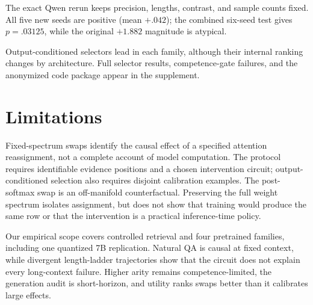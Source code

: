 \documentclass[letterpaper]{article} %
\begin{document}
The exact Qwen rerun keeps precision, lengths, contrast, and sample counts fixed. All five new seeds are positive
(mean $+.042$); the combined six-seed test gives $p=.03125$, while the original $+1.882$ magnitude is atypical.

Output-conditioned selectors lead in each family, although their internal ranking changes by architecture. Full
selector results, competence-gate failures, and the anonymized code package appear in the supplement.

\section{Limitations}

Fixed-spectrum swaps identify the causal effect of a specified attention reassignment, not a complete account
of model computation. The protocol requires identifiable evidence positions and a chosen intervention circuit;
output-conditioned selection also requires disjoint calibration examples. The post-softmax swap is an
off-manifold counterfactual. Preserving the full weight spectrum isolates assignment, but does not show that
training would produce the same row or that the intervention is a practical inference-time policy.

Our empirical scope covers controlled retrieval and four pretrained families, including one quantized 7B
replication. Natural QA is causal at fixed context, while divergent length-ladder trajectories show that the
circuit does not explain every long-context failure. Higher arity remains competence-limited, the generation
audit is short-horizon, and utility ranks swaps better than it calibrates large effects.

{\small

}
\end{document}
